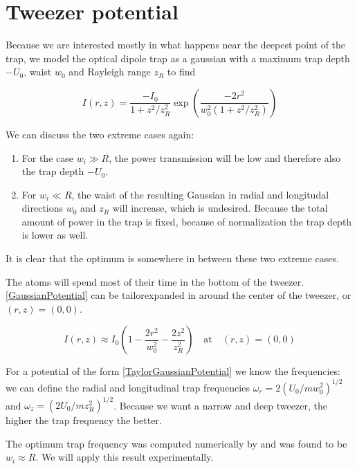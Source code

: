 \section{Tweezer potential}

Because we are interested mostly in what happens near the deepest point of the trap, we model the optical dipole trap as a gaussian with a maximum trap depth $-U_0$, waist $w_0$ and Rayleigh range $z_R$ to find 

\begin{equation}\label{GaussianPotential}
    I(r,z)=\frac{-I_{0}}{1+z^{2} / z_{R}^{2}} \exp \left(\frac{-2 r^{2}}{w_{0}^{2}\left(1+z^{2} / z_{R}^{2}\right)}\right)
\end{equation}

We can discuss the two extreme cases again:

\begin{enumerate}
    \item For the case $w_i \gg R$, the power transmission will be low and therefore also the trap depth $-U_0$.
    \item For $w_i \ll R$, the waist of the resulting Gaussian in radial and longitudal directions $w_0$ and $z_R$ will increase, which is undesired. Because the total amount of power in the trap is fixed, because of normalization the trap depth is lower as well. 
\end{enumerate}

It is clear that the optimum is somewhere in between these two extreme cases.  

The atoms will spend most of their time in the bottom of the tweezer. \cref{GaussianPotential} can be tailorexpanded in around the center of the tweezer, or $(r,z) = (0,0)$.

\begin{equation}\label{TaylorGaussianPotential}
    I(r,z) \approx I_0 \left(1 - \frac{2r^2}{w_0^2} - \frac{2z^2}{z_R^2}\right) \quad \text{at} \quad (r,z) = (0,0)
\end{equation}

For a potential of the form \cref{TaylorGaussianPotential} we know the frequencies: we can define the radial and longitudinal trap frequencies $\omega_r = 2\left(U_0/m w_0^2\right)^{1/2}$ and $\omega_z= \left(2 U_0/m z_R^2\right)^{1/2}$. Because we want a narrow and deep tweezer, the higher the trap frequency the better. 

The optimum trap frequency was computed numerically by \cite{Madjarov2021} and was found to be $w_i \approx R$. We will apply this result experimentally. 


